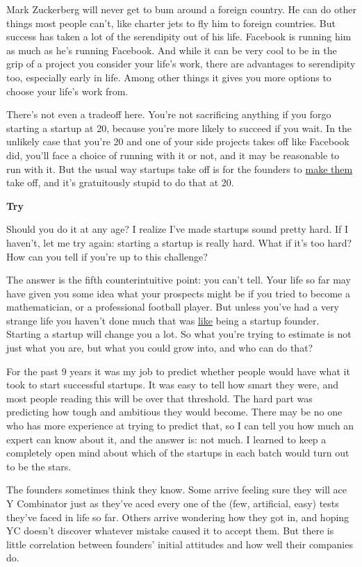 \documentclass[12pt]{book}
\begin{document}
Mark Zuckerberg will never get to bum around a foreign country. He can
do other things most people can't, like charter jets to fly him to
foreign countries. But success has taken a lot of the serendipity out of
his life. Facebook is running him as much as he's running Facebook. And
while it can be very cool to be in the grip of a project you consider
your life's work, there are advantages to serendipity too, especially
early in life. Among other things it gives you more options to choose
your life's work from.

There's not even a tradeoff here. You're not sacrificing anything if you
forgo starting a startup at 20, because you're more likely to succeed if
you wait. In the unlikely case that you're 20 and one of your side
projects takes off like Facebook did, you'll face a choice of running
with it or not, and it may be reasonable to run with it. But the usual
way startups take off is for the founders to \href{ds.html}{make them}
take off, and it's gratuitously stupid to do that at 20.

\textbf{Try}

Should you do it at any age? I realize I've made startups sound pretty
hard. If I haven't, let me try again: starting a startup is really hard.
What if it's too hard? How can you tell if you're up to this challenge?

The answer is the fifth counterintuitive point: you can't tell. Your
life so far may have given you some idea what your prospects might be if
you tried to become a mathematician, or a professional football player.
But unless you've had a very strange life you haven't done much that was
\href{really.html}{like} being a startup founder. Starting a startup
will change you a lot. So what you're trying to estimate is not just
what you are, but what you could grow into, and who can do that?

For the past 9 years it was my job to predict whether people would have
what it took to start successful startups. It was easy to tell how smart
they were, and most people reading this will be over that threshold. The
hard part was predicting how tough and ambitious they would become.
There may be no one who has more experience at trying to predict that,
so I can tell you how much an expert can know about it, and the answer
is: not much. I learned to keep a completely open mind about which of
the startups in each batch would turn out to be the stars.

The founders sometimes think they know. Some arrive feeling sure they
will ace Y Combinator just as they've aced every one of the (few,
artificial, easy) tests they've faced in life so far. Others arrive
wondering how they got in, and hoping YC doesn't discover whatever
mistake caused it to accept them. But there is little correlation
between founders' initial attitudes and how well their companies do.
\end{document}
